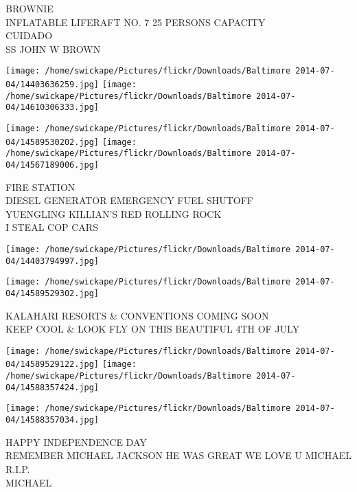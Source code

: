 \documentclass[10pt,letterpaper]{article}
\begin{document}
BROWNIE\\
INFLATABLE LIFERAFT NO. 7 25 PERSONS CAPACITY\\
CUIDADO\\
SS JOHN W BROWN\\
\pagebreak

\texttt{[image: /home/swickape/Pictures/flickr/Downloads/Baltimore 2014-07-04/14403636259.jpg]}
\texttt{[image: /home/swickape/Pictures/flickr/Downloads/Baltimore 2014-07-04/14610306333.jpg]}

\texttt{[image: /home/swickape/Pictures/flickr/Downloads/Baltimore 2014-07-04/14589530202.jpg]}
\texttt{[image: /home/swickape/Pictures/flickr/Downloads/Baltimore 2014-07-04/14567189006.jpg]}

FIRE STATION\\
DIESEL GENERATOR EMERGENCY FUEL SHUTOFF\\
YUENGLING KILLIAN'S RED ROLLING ROCK\\
I STEAL COP CARS\\
\pagebreak

\texttt{[image: /home/swickape/Pictures/flickr/Downloads/Baltimore 2014-07-04/14403794997.jpg]}

\vspace{0.25in}
\texttt{[image: /home/swickape/Pictures/flickr/Downloads/Baltimore 2014-07-04/14589529302.jpg]}

KALAHARI RESORTS \& CONVENTIONS COMING SOON\\
KEEP COOL \& LOOK FLY ON THIS BEAUTIFUL 4TH OF JULY\\
\pagebreak

\texttt{[image: /home/swickape/Pictures/flickr/Downloads/Baltimore 2014-07-04/14589529122.jpg]}
\texttt{[image: /home/swickape/Pictures/flickr/Downloads/Baltimore 2014-07-04/14588357424.jpg]}

\texttt{[image: /home/swickape/Pictures/flickr/Downloads/Baltimore 2014-07-04/14588357034.jpg]}

HAPPY INDEPENDENCE DAY\\
REMEMBER MICHAEL JACKSON HE WAS GREAT WE LOVE U MICHAEL R.I.P.\\
MICHAEL\\
\pagebreak
\end{document}
